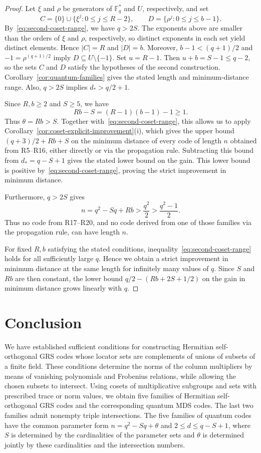\documentclass[preprint,12pt,a4paper]{elsarticle}
\begin{document}
\begin{proof}
Let $\xi$ and $\rho$ be generators of $\mathbb F_q^{*}$ and $U$, respectively, and set
\[
 C=\{0\}\cup\{\xi^j:0\le j\le R-2\},
 \qquad D=\{\rho^j:0\le j\le b-1\}.
\]
By~\eqref{eq:second-coset-range}, we have $q>2S$. The exponents above are smaller than the orders of $\xi$ and $\rho$, respectively, so distinct exponents in each set yield distinct elements. Hence $|C|=R$ and $|D|=b$. Moreover, $b-1<(q+1)/2$ and $-1=\rho^{(q+1)/2}$ imply $D\subseteq U\setminus\{-1\}$. Set $u=R-1$. Then $u+b=S-1\le q-2$, so the sets $C$ and $D$ satisfy the hypotheses of the second construction. Corollary~\ref{cor:quantum-families} gives the stated length and minimum-distance range. Also, $q>2S$ implies $d_*>q/2+1$.

Since $R,b\ge2$ and $S\ge5$, we have
\[
 Rb-S=(R-1)(b-1)-1\ge1.
\]
Thus $\theta=Rb>S$. Together with~\eqref{eq:second-coset-range}, this allows us to apply Corollary~\ref{cor:coset-explicit-improvement}\textup{(i)}, which gives the upper bound $(q+3)/2+Rb+S$ on the minimum distance of every code of length $n$ obtained from R5--R16, either directly or via the propagation rule. Subtracting this bound from $d_*=q-S+1$ gives the stated lower bound on the gain. This lower bound is positive by~\eqref{eq:second-coset-range}, proving the strict improvement in minimum distance.

Furthermore, $q>2S$ gives
\[
 n=q^2-Sq+Rb>\frac{q^2}{2}>\frac{q^2-1}{2}.
\]
Thus no code from R17--R20, and no code derived from one of those families via the propagation rule, can have length $n$.

For fixed $R,b$ satisfying the stated conditions, inequality~\eqref{eq:second-coset-range} holds for all sufficiently large $q$. Hence we obtain a strict improvement in minimum distance at the same length for infinitely many values of $q$. Since $S$ and $Rb$ are then constant, the lower bound $q/2-(Rb+2S+1/2)$ on the gain in minimum distance grows linearly with $q$.
\end{proof}

\section{Conclusion}\label{sec:conclusion}

We have established sufficient conditions for constructing Hermitian self-orthogonal GRS codes whose locator sets are complements of unions of subsets of a finite field. These conditions determine the norms of the column multipliers by means of vanishing polynomials and Frobenius relations, while allowing the chosen subsets to intersect. Using cosets of multiplicative subgroups and sets with prescribed trace or norm values, we obtain five families of Hermitian self-orthogonal GRS codes and the corresponding quantum MDS codes. The last two families admit nonempty triple intersections. The five families of quantum codes have the common parameter form $n=q^2-Sq+\theta$ and $2\le d\le q-S+1$, where $S$ is determined by the cardinalities of the parameter sets and $\theta$ is determined jointly by these cardinalities and the intersection numbers.
\end{document}
